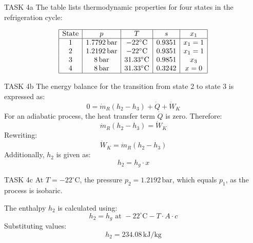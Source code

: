 TASK 4a  
The table lists thermodynamic properties for four states in the refrigeration cycle:  

\[
\begin{array}{|c|c|c|c|c|}
\hline
\text{State} & p & T & s & x_1 \\
\hline
1 & 1.7792 \, \text{bar} & -22^\circ\text{C} & 0.9351 & x_1 = 1 \\
2 & 1.2192 \, \text{bar} & -22^\circ\text{C} & 0.9351 & x_1 = 1 \\
3 & 8 \, \text{bar} & 31.33^\circ\text{C} & 0.9851 & x_3 \\
4 & 8 \, \text{bar} & 31.33^\circ\text{C} & 0.3242 & x = 0 \\
\hline
\end{array}
\]

TASK 4b  
The energy balance for the transition from state 2 to state 3 is expressed as:  
\[
0 = \dot{m}_R (h_2 - h_3) + \dot{Q} + \dot{W}_K
\]  
For an adiabatic process, the heat transfer term \( \dot{Q} \) is zero. Therefore:  
\[
\dot{m}_R (h_2 - h_3) = \dot{W}_K
\]  
Rewriting:  
\[
\dot{W}_K = \dot{m}_R (h_2 - h_3)
\]  
Additionally, \( h_2 \) is given as:  
\[
h_2 = h_g \cdot x
\]  

TASK 4c  
At \( T = -22^\circ\text{C} \), the pressure \( p_2 = 1.2192 \, \text{bar} \), which equals \( p_1 \), as the process is isobaric.  

The enthalpy \( h_2 \) is calculated using:  
\[
h_2 = h_g \text{ at } -22^\circ\text{C} - T \cdot A \cdot c
\]  
Substituting values:  
\[
h_2 = 234.08 \, \text{kJ/kg}
\]  